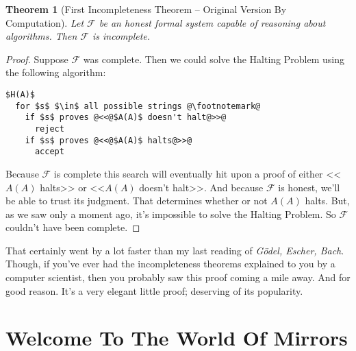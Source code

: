 \documentclass{article}
\theoremstyle{theorem}
\newtheorem{theorem}{Theorem}
\begin{document}
\begin{theorem}[First Incompleteness Theorem -- Original Version By Computation]
\label{original-first-by-computation}
Let $\mathcal{F}$ be an honest formal system capable of reasoning about algorithms. Then $\mathcal{F}$ is incomplete.
\end{theorem}

\begin{proof}
Suppose $\mathcal{F}$ was complete. Then we could solve the Halting Problem using the following algorithm:\\[0.5em]
\begin{minipage}{\linewidth}
\begin{lstlisting}
$H(A)$
  for $s$ $\in$ all possible strings @\footnotemark@
    if $s$ proves @<<@$A(A)$ doesn't halt@>>@
      reject
    if $s$ proves @<<@$A(A)$ halts@>>@
      accept
\end{lstlisting}
\end{minipage}
Because $\mathcal{F}$ is complete this search will eventually hit upon a proof of  either <<$A(A)$ halts>> or <<$A(A)$ doesn't halt>>. And because $\mathcal{F}$ is honest, we'll be able to trust its judgment. That determines whether or not $A(A)$ halts. But, as we saw only a moment ago, it's impossible to solve the Halting Problem. So $\mathcal{F}$ couldn't have been complete.
\end{proof}

That certainly went by a lot faster than my last reading of \textit{Gödel, Escher, Bach}. Though, if you've ever had the incompleteness theorems explained to you by a computer scientist, then you probably saw this proof coming a mile away. And for good reason. It's a very elegant little proof; deserving of its popularity.

\section{Welcome To The World Of Mirrors}
\end{document}
